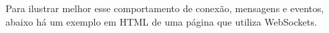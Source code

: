 \documentclass[a4paper,12pt]{article}
\begin{document}







Para ilustrar melhor esse comportamento de conexão, mensagens e eventos, abaixo há um exemplo em HTML de uma página que utiliza WebSockets.
\end{document}
